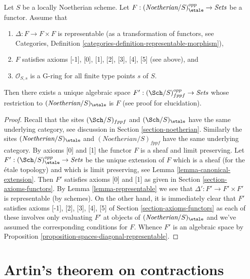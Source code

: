 \begin{proposition}
\label{proposition-spaces-diagonal-representable-noetherian}
Let $S$ be a locally Noetherian scheme. Let
$F : (\textit{Noetherian}/S)_\etale^{opp} \to \textit{Sets}$
be a functor. Assume that
\begin{enumerate}
\item $\Delta : F \to F \times F$ is representable
(as a transformation of functors, see
Categories, Definition \ref{categories-definition-representable-morphism}),
\item $F$ satisfies axioms [-1], [0], [1], [2], [3], [4], [5]
(see above), and
\item $\mathcal{O}_{S, s}$ is a G-ring for all finite type points $s$ of $S$.
\end{enumerate}
Then there exists a unique algebraic space
$F' : (\Sch/S)_{fppf}^{opp} \to \textit{Sets}$
whose restriction to $(\textit{Noetherian}/S)_\etale$ is $F$
(see proof for elucidation).
\end{proposition}

\begin{proof}
Recall that the sites $(\Sch/S)_{fppf}$ and $(\Sch/S)_\etale$ have the same
underlying category, see discussion in Section \ref{section-noetherian}.
Similarly the sites $(\textit{Noetherian}/S)_\etale$ and
$(\textit{Noetherian}/S)_{fppf}$ have the same underlying category.
By axioms [0] and [1] the functor $F$ is a sheaf and
limit preserving.
Let $F' : (\Sch/S)_\etale^{opp} \to \textit{Sets}$
be the unique extension of $F$ which is a sheaf (for the \'etale topology)
and which is limit preserving, see
Lemma \ref{lemma-canonical-extension}.
Then $F'$ satisfies axioms [0] and [1] as given in
Section \ref{section-axioms-functors}.
By Lemma \ref{lemma-representable} we see that
$\Delta' : F' \to F' \times F'$ is representable (by schemes).
On the other hand, it is immediately clear that
$F'$ satisfies axioms [-1], [2], [3], [4], [5] of
Section \ref{section-axioms-functors}
as each of these involves only evaluating $F'$ at objects
of $(\textit{Noetherian}/S)_\etale$ and we've assumed the
corresponding conditions for $F$.
Whence $F'$ is an algebraic space by
Proposition \ref{proposition-spaces-diagonal-representable}.
\end{proof}












\section{Artin's theorem on contractions}
\label{section-contractions}

